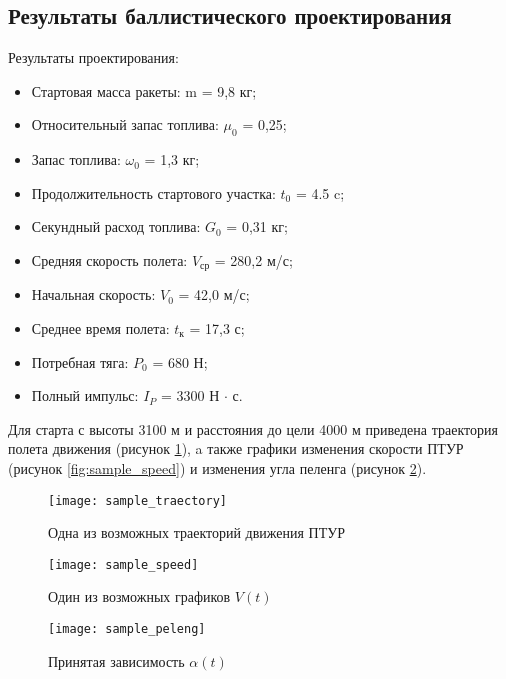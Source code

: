 \subsection{Результаты баллистического проектирования}
Результаты проектирования:
\begin{itemize}
	\item Стартовая масса ракеты:     m = 9,8 кг;
	\item Относительный запас топлива:    $\mu_0$ = 0,25;
	\item Запас топлива:       $\omega_0$ = 1,3 кг;
	\item Продолжительность стартового участка:  $t_0$ = 4.5 c;
	\item Секундный расход топлива:    $G_0$ = 0,31 кг;
	\item Средняя скорость полета:     $V_{\text{ср}}$ = 280,2 м/с;
	\item Начальная скорость:      $V_0$ = 42,0 м/с;
	\item Среднее время полета:     $t_\text{к}$ = 17,3 с;
	\item Потребная тяга:      $P_0$ = 680 Н;
	\item Полный импульс:      $I_P$ = 3300 Н $\cdot$ с.
\end{itemize}

Для старта с высоты 3100 м и расстояния до цели 4000 м приведена траектория полета движения (рисунок \ref{fig:sample_traectory}), a также графики изменения скорости ПТУР (рисунок \ref{fig:sample_speed}) и изменения угла пеленга (рисунок \ref{fig:sample_peleng}).
\clearpage

\begin{figure}[!h]
\begin{center}
	\texttt{[image: sample\_traectory]}
	\caption{Одна из возможных траекторий движения ПТУР}
	\label{fig:sample_traectory}
\end{center}
\end{figure}

\begin{figure}[h]
\begin{center}

	\begin{minipage}[h]{0.47\linewidth}
		\texttt{[image: sample\_speed]}
		\caption{Один из возможных графиков $V(t)$}
		\label{fig:sample_speed}
	\end{minipage}
	\hfill
	\begin{minipage}[h]{0.47\linewidth}
		\texttt{[image: sample\_peleng]}
		\caption{Принятая зависимость $\alpha(t)$}
		\label{fig:sample_peleng}
	\end{minipage}
\end{center}
\end{figure}

